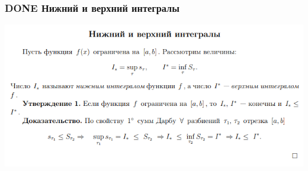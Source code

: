 \documentclass[11pt]{article}
\begin{document}
\subsubsection{{\bfseries\sffamily DONE} Нижний и верхний интегралы}
\label{sec:orga18ba04}
\begin{center}
\includegraphics[width=.9\linewidth]{img/b2-nvint.png}
\end{center}
\end{document}
